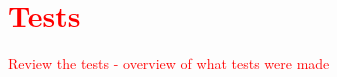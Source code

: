 \chapter{\textcolor{red}{Tests}}
\textcolor{red}{Review the tests - overview of what tests were made}